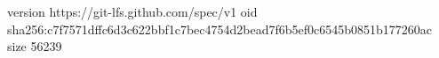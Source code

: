 version https://git-lfs.github.com/spec/v1
oid sha256:c7f7571dffc6d3c622bbf1c7bec4754d2bead7f6b5ef0c6545b0851b177260ac
size 56239
